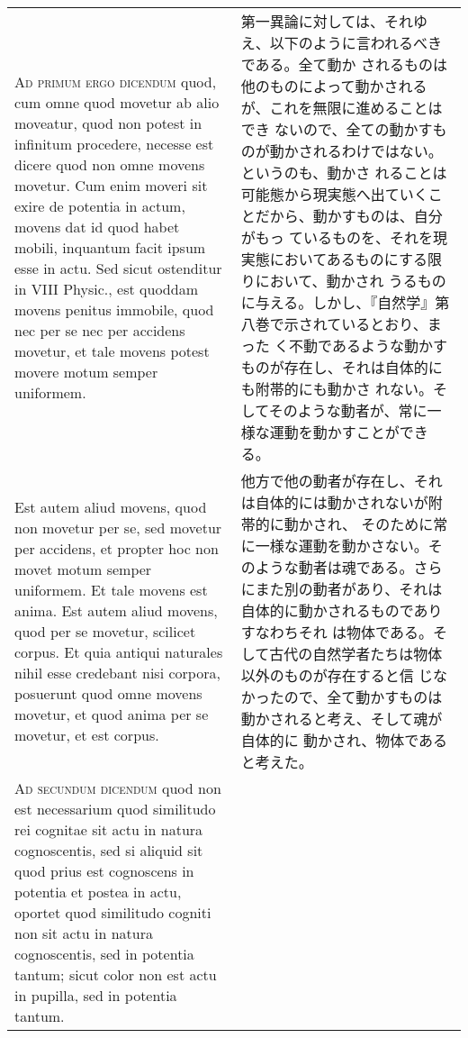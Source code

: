 \documentclass[paper=a4paper,fontsize=10pt,jafontsize=9pt,titlepage]{jlreq}
\begin{document}
\begin{longtable}{p{21em}p{21em}}
{\scshape Ad primum ergo dicendum} quod, cum omne quod movetur ab alio moveatur,
quod non potest in infinitum procedere, necesse est dicere quod non
omne movens movetur. Cum enim moveri sit exire de potentia in actum,
movens dat id quod habet mobili, inquantum facit ipsum esse in
actu. Sed sicut ostenditur in VIII Physic., est quoddam movens penitus
immobile, quod nec per se nec per accidens movetur, et tale movens
potest movere motum semper uniformem. 


&

第一異論に対しては、それゆえ、以下のように言われるべきである。全て動か
されるものは他のものによって動かされるが、これを無限に進めることはでき
ないので、全ての動かすものが動かされるわけではない。というのも、動かさ
れることは可能態から現実態へ出ていくことだから、動かすものは、自分がもっ
ているものを、それを現実態においてあるものにする限りにおいて、動かされ
うるものに与える。しかし、『自然学』第八巻で示されているとおり、まった
く不動であるような動かすものが存在し、それは自体的にも附帯的にも動かさ
れない。そしてそのような動者が、常に一様な運動を動かすことができる。


\\




Est autem aliud movens, quod non
movetur per se, sed movetur per accidens, et propter hoc non movet
motum semper uniformem. Et tale movens est anima. Est autem aliud
movens, quod per se movetur, scilicet corpus. Et quia antiqui
naturales nihil esse credebant nisi corpora, posuerunt quod omne
movens movetur, et quod anima per se movetur, et est corpus.


&

他方で他の動者が存在し、それは自体的には動かされないが附帯的に動かされ、
そのために常に一様な運動を動かさない。そのような動者は魂である。さら
にまた別の動者があり、それは自体的に動かされるものでありすなわちそれ
は物体である。そして古代の自然学者たちは物体以外のものが存在すると信
じなかったので、全て動かすものは動かされると考え、そして魂が自体的に
動かされ、物体であると考えた。


\\



{\scshape Ad secundum dicendum} quod non est necessarium quod similitudo rei
cognitae sit actu in natura cognoscentis, sed si aliquid sit quod
prius est cognoscens in potentia et postea in actu, oportet quod
similitudo cogniti non sit actu in natura cognoscentis, sed in
potentia tantum; sicut color non est actu in pupilla, sed in potentia
tantum. 


\end{longtable}
\end{document}
